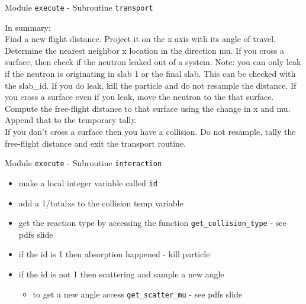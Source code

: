 \documentclass{beamer}
\begin{document}
\begin{frame}[allowframebreaks]{Module \texttt{execute} - Subroutine \texttt{transport}}
\begin{itemize}
  \end{itemize}

In summary: \\
Find a new flight distance. Project it on the x axis with its angle of travel. Determine the nearest
neighbor x location in the direction mu. If you cross a surface, then check if the neutron leaked out 
of a system.  Note: you can only leak if the neutron is originating in slab 1 or the final slab.  This can
be checked with the slab\_id. If you do leak, kill the particle and do not resample the distance.  If you cross
a surface even if you leak, move the neutron to the that surface.  Compute the free-flight distance to that surface
using the change in x and mu. Append that to the temporary tally.\\
If you don't cross a surface then you have a collision. Do not resample, tally the free-flight distance and exit the 
transport routine.
\end{frame}
\begin{frame}{Module \texttt{execute} - Subroutine \texttt{interaction}}

  \begin{itemize}
    \item make a local integer variable called \texttt{id}
    \vfill\item add a 1/totalxs to the collision temp variable
    \vfill\item get the reaction type by accessing the function \texttt{get\_collision\_type} - see pdfs slide
    \vfill\item if the id is 1 then absorption happened - kill particle
    \vfill\item if the id is not 1 then scattering and sample a new angle
    \begin{itemize}
      \item to get a new angle access \texttt{get\_scatter\_mu} - see pdfs slide
    \end{itemize}
  \end{itemize}

\end{frame}
\end{document}
